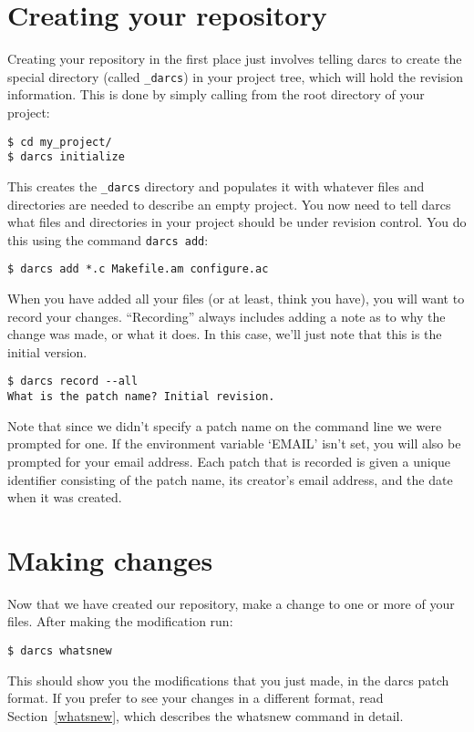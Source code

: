 \documentclass{book}
\begin{document}
\section{Creating your repository}

Creating your repository in the first place just involves telling darcs to
create the special directory (called {\tt \_darcs}) in your project tree,
which will hold the revision information.  This is done by simply calling
from the root directory of your project:
\begin{verbatim}
$ cd my_project/
$ darcs initialize
\end{verbatim}
This creates the \verb|_darcs| directory and populates it with whatever
files and directories are needed to describe an empty project.  You now
need to tell darcs what files and directories in your project should be
under revision control.  You do this using the command \verb|darcs add|:
\begin{verbatim}
$ darcs add *.c Makefile.am configure.ac
\end{verbatim}
When you have added all your files (or at least, think you have), you will
want to record your changes.  ``Recording'' always includes adding a note
as to why the change was made, or what it does.  In this case, we'll just
note that this is the initial version.
\begin{verbatim}
$ darcs record --all
What is the patch name? Initial revision.
\end{verbatim}
Note that since we didn't specify a patch name on the command line we were
prompted for one.  If the environment variable `EMAIL' isn't set, you will
also be prompted for your email address.  Each patch that is recorded is
given a unique identifier consisting of the patch name, its creator's email
address, and the date when it was created.

\section{Making changes}

Now that we have created our repository, make a change to one or more of
your files.  After making the modification run:
\begin{verbatim}
$ darcs whatsnew
\end{verbatim}
This should show you the modifications that you just made, in the darcs
patch format.  If you prefer to see your changes in a different format,
read Section~\ref{whatsnew}, which describes the whatsnew command in
detail.
\end{document}
